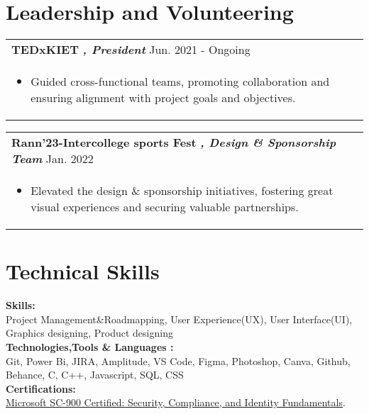 \documentclass[a4paper,8pt]{article}
\begin{document}
\section{Leadership and Volunteering}
\begin{tabularx}{\linewidth}{ @{}l r@{} }
\color[HTML]{1C033C} \textbf{TEDxKIET} \color[HTML]{371e77}\textbf{\textit{, President}} \hfill \color[HTML]{371e77} Jun. 2021 - Ongoing \\[5pt]
\begin{minipage}[t]{\linewidth}
    \begin{itemize}[nosep,after=\strut, leftmargin=2em, itemsep=2pt]
        \item Guided cross-functional teams, promoting collaboration and ensuring alignment with project goals and objectives.
    \end{itemize}
\end{minipage}
\end{tabularx}
\begin{tabularx}{\linewidth}{ @{}l r@{} }
\color[HTML]{1C033C} \textbf{Rann'23-Intercollege sports Fest} \color[HTML]{371e77}\textbf{\textit{, Design \& Sponsorship Team}} \hfill \color[HTML]{371e77} Jan. 2022 \\[5pt]
\begin{minipage}[t]{\linewidth}
    \begin{itemize}[nosep,after=\strut, leftmargin=2em, itemsep=2pt]
        \item Elevated the design \& sponsorship initiatives, fostering great visual experiences and securing valuable partnerships.
    \end{itemize}
\end{minipage}
\end{tabularx}
\section{Technical Skills}
\color[HTML]{1C033C}\textbf{Skills:} \\[2pt]
\color[HTML]{371e77}  Project Management\&Roadmapping, User Experience(UX), User Interface(UI), Graphics designing, Product designing\\[3pt]
\color[HTML]{1C033C}\textbf{Technologies,Tools \& Languages :} \\[2pt]
\color[HTML]{371e77}  Git, Power Bi, JIRA, Amplitude, VS Code, Figma, Photoshop, Canva, Github, Behance, C, C++, Javascript, SQL, CSS\\[3pt]
\color[HTML]{1C033C}\textbf{Certifications:} \\[2pt]
\color[HTML]{371e77} \uline{\href{https://learn.microsoft.com/}{Microsoft SC-900 Certified: Security, Compliance, and Identity Fundamentals}}.
\end{document}
